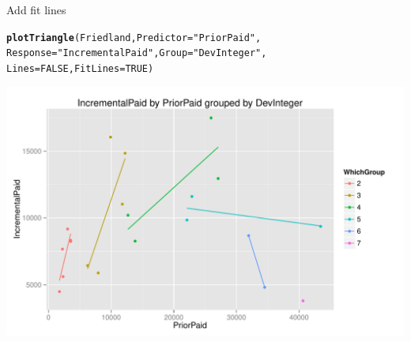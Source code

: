 \documentclass[xcolor=dvipsnames]{beamer}\usepackage{graphicx, color}
\makeatletter
\def\maxwidth{ %
  \ifdim\Gin@nat@width>\linewidth
    \linewidth
  \else
    \Gin@nat@width
  \fi
}
\newcommand{\hlfunctioncall}[1]{\textcolor[rgb]{0.501960784313725,0,0.329411764705882}{\textbf{#1}}}%
\newcommand{\hlstring}[1]{\textcolor[rgb]{0.6,0.6,1}{#1}}%
\newenvironment{kframe}{%
 \def\at@end@of@kframe{}%
 \ifinner\ifhmode%
  \def\at@end@of@kframe{\end{minipage}}%
  \begin{minipage}{\columnwidth}%
 \fi\fi%
 \def\FrameCommand##1{\hskip\@totalleftmargin \hskip-\fboxsep
 \colorbox{shadecolor}{##1}\hskip-\fboxsep
     \hskip-\linewidth \hskip-\@totalleftmargin \hskip\columnwidth}%
 \MakeFramed {\advance\hsize-\width
   \@totalleftmargin\z@ \linewidth\hsize
   \@setminipage}}%
 {\par\unskip\endMakeFramed%
 \at@end@of@kframe}
\newenvironment{knitrout}{}{} %
\makeatother
\begin{document}
\begin{frame}[fragile]{Add fit lines}
\begin{knitrout}
\color{fgcolor}\begin{kframe}
\begin{alltt}
\hlfunctioncall{plotTriangle}(Friedland, Predictor = \hlstring{"PriorPaid"}, 
    Response = \hlstring{"IncrementalPaid"}, Group = \hlstring{"DevInteger"}, 
    Lines = FALSE, FitLines = TRUE)
\end{alltt}


{\ttfamily\noindent\color{warningcolor}{\#\# Warning: Removed 7 rows containing missing values (stat\_smooth).}}

{\ttfamily\noindent\color{warningcolor}{\#\# Warning: Removed 7 rows containing missing values (geom\_point).}}\end{kframe}
\includegraphics[width=\maxwidth]{figure/Friedland5} 

\end{knitrout}

\end{frame}
\end{document}
